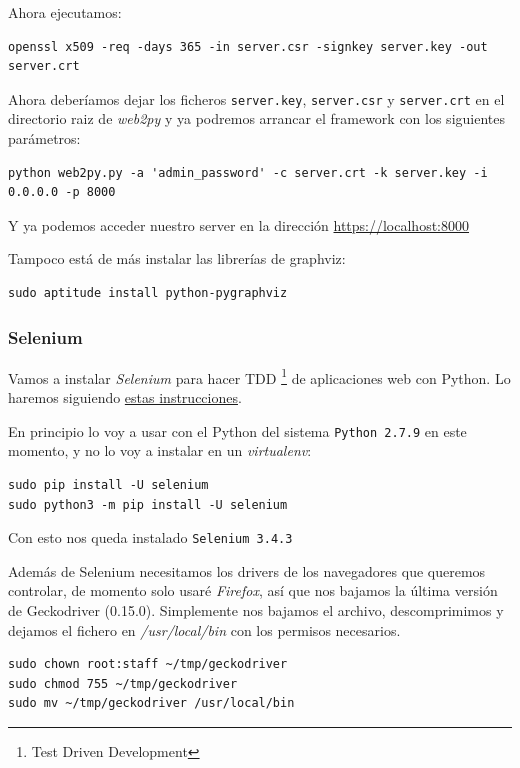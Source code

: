 \documentclass[12pt,spanish,]{scrartcl}
\begin{document}
Ahora ejecutamos:

\begin{verbatim}
openssl x509 -req -days 365 -in server.csr -signkey server.key -out server.crt
\end{verbatim}

Ahora deberíamos dejar los ficheros \texttt{server.key},
\texttt{server.csr} y \texttt{server.crt} en el directorio raiz de
\emph{web2py} y ya podremos arrancar el framework con los siguientes
parámetros:

\begin{verbatim}
python web2py.py -a 'admin_password' -c server.crt -k server.key -i 0.0.0.0 -p 8000
\end{verbatim}

Y ya podemos acceder nuestro server en la dirección
\url{https://localhost:8000}

Tampoco está de más instalar las librerías de graphviz:

\begin{verbatim}
sudo aptitude install python-pygraphviz
\end{verbatim}

\hypertarget{selenium}{%
\subsubsection{Selenium}\label{selenium}}

Vamos a instalar \emph{Selenium} para hacer TDD \footnote{Test Driven
  Development} de aplicaciones web con Python. Lo haremos siguiendo
\href{http://selenium-python.readthedocs.io/index.html}{estas
instrucciones}.

En principio lo voy a usar con el Python del sistema
\texttt{Python\ 2.7.9} en este momento, y no lo voy a instalar en un
\emph{virtualenv}:

\begin{verbatim}
sudo pip install -U selenium
sudo python3 -m pip install -U selenium
\end{verbatim}

Con esto nos queda instalado \texttt{Selenium\ 3.4.3}

Además de Selenium necesitamos los drivers de los navegadores que
queremos controlar, de momento solo usaré \emph{Firefox}, así que nos
bajamos la última versión de Geckodriver (0.15.0). Simplemente nos
bajamos el archivo, descomprimimos y dejamos el fichero en
\emph{/usr/local/bin} con los permisos necesarios.

\begin{verbatim}
sudo chown root:staff ~/tmp/geckodriver
sudo chmod 755 ~/tmp/geckodriver
sudo mv ~/tmp/geckodriver /usr/local/bin
\end{verbatim}
\end{document}
